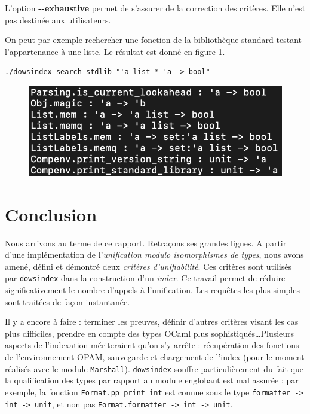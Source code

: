 \documentclass[a4paper]{report}
\theoremstyle{definition}
\newcommand{\dowsindex}{\texttt{dowsindex}\xspace}
\begin{document}
L'option \textbf{-{}-exhaustive} permet de s'assurer de la correction des critères. Elle n'est pas destinée aux utilisateurs.

On peut par exemple rechercher une fonction de la bibliothèque standard testant l'appartenance à une liste. Le résultat est donné en figure \ref{fig_dowsindex_search}.

\begin{verbatim}
./dowsindex search stdlib "'a list * 'a -> bool"
\end{verbatim}

\begin{figure}[h]
  \begin{center}
    \includegraphics[scale=0.25]{images/dowsindex-search}
  \end{center}
  \caption{\label{fig_dowsindex_search}}
\end{figure}


\chapter{Conclusion}

Nous arrivons au terme de ce rapport. Retraçons ses grandes lignes. A partir d'une implémentation de l'\emph{unification modulo isomorphismes de types}, nous avons amené, défini et démontré deux \emph{critères d'unifiabilité}. Ces critères sont utilisés par \dowsindex dans la construction d'un \emph{index}. Ce travail permet de réduire significativement le nombre d'appels à l'unification. Les requêtes les plus simples sont traitées de façon instantanée.

Il y a encore à faire : terminer les preuves, définir d'autres critères visant les cas plus difficiles, prendre en compte des types OCaml plus sophistiqués\dots Plusieurs aspects de l'indexation mériteraient qu'on s'y arrête : récupération des fonctions de l'environnement OPAM, sauvegarde et chargement de l'index (pour le moment réalisés avec le module \texttt{Marshall}). \dowsindex souffre particulièrement du fait que la qualification des types par rapport au module englobant est mal assurée ; par exemple, la fonction \texttt{Format.pp_print_int} est connue sous le type \texttt{formatter -> int -> unit}, et non pas \texttt{Format.formatter -> int -> unit}.
\end{document}
